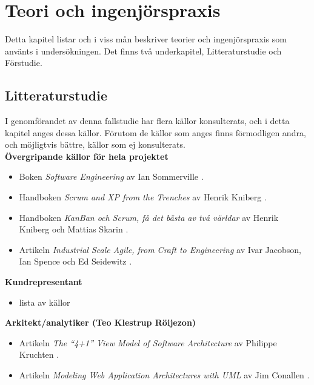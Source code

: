 \documentclass[conference,a4paper]{IEEEtran}
\begin{document}
\section{Teori och ingenjörspraxis} \label{sec:teori}
Detta kapitel listar och i viss mån beskriver teorier och ingenjörspraxis som använts i undersökningen. Det finns två underkapitel, Litteraturstudie och Förstudie.
\subsection{Litteraturstudie}
I genomförandet av denna fallstudie har flera källor konsulterats, och i detta kapitel anges dessa källor. Förutom de källor som anges finns förmodligen andra, och möjligtvis bättre, källor som ej konsulterats.\\

\noindent \textbf{Övergripande källor för hela projektet}
\begin{itemize}
\item Boken \textit{Software Engineering} av Ian Sommerville \cite[kap. 1,2,3]{Sommerville10}.
\\
\item Handboken \textit{Scrum and XP from the Trenches} av Henrik Kniberg \cite{Kniberg07}.
\\
\item Handboken \textit{KanBan och Scrum, få det bästa av två världar} av Henrik Kniberg och Mattias Skarin \cite{Kniberg10}.
\\
\item Artikeln \textit{Industrial Scale Agile, from Craft to Engineering} av Ivar Jacobson, Ian Spence och Ed Seidewitz \cite{Jacobson16}.
\\
\end{itemize}

\noindent \textbf{Kundrepresentant}
\begin{itemize}
\item lista av källor
\\
\end{itemize}

\noindent \textbf{Arkitekt/analytiker (Teo Klestrup Röijezon)}
\begin{itemize}
\item Artikeln \textit{The “4+1” View Model of Software Architecture} av Philippe Kruchten \cite{Kruchten95}.
\item Artikeln \textit{Modeling Web Application Architectures with UML} av Jim Conallen \cite{Conallen99}.
\\
\end{itemize}
\end{document}
